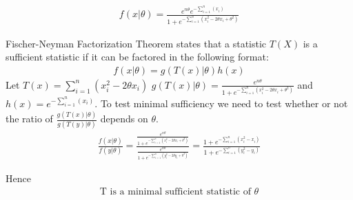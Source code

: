 \documentclass{article}
\begin{document}
\begin{align*}
f(x|\theta) = \frac{e^{n\theta} e^{-\sum_{i=1}^{n}(x_i)} }{1+e^{-\sum_{i=1}^{n} (x_i^2-2\theta x_i+\theta^2)}}
\end{align*}

Fischer-Neyman Factorization Theorem states that a statistic $T(X)$ is a sufficient statistic if it can be factored in the following format:
\begin{align*}
f(x|\theta) = g(T(x)|\theta)h(x)
\end{align*}
Let $T(x)=\sum_{i=1}^{n} (x_i^2-2\theta x_i)$ $g(T(x)|\theta)= \frac{e^{n\theta}}{1+e^{{-\sum_{i=1}^{n} (x_i^2-2\theta x_i+\theta^2)}}} $ and $h(x) = e^{-\sum_{i=1}^{n}(x_i)}$. To test minimal sufficiency we need to test whether or not the ratio of $\frac{g(T(x)|\theta)}{g(T(y)|\theta)}$ depends on $\theta$.
\begin{align*}
\frac{f(x|\theta)}{f(y|\theta)} = \frac{\frac{e^{n\theta}}{1+e^{{-\sum_{i=1}^{n} (x_i^2-2\theta x_i+\theta^2)}}}}{\frac{e^{n\theta}}{1+e^{{-\sum_{i=1}^{n} (y_i^2-2\theta y_i+\theta^2)}}}} = \frac{1+e^{{-\sum_{i=1}^{n} (x_i^2-x_i)}}}{1+e^{{-\sum_{i=1}^{n} (y_i^2-y_i)}}}
\end{align*}

Hence
\begin{align*}
\boxed{ \text{T is a minimal sufficient statistic of } \theta}
\end{align*}

\clearpage
\end{document}
